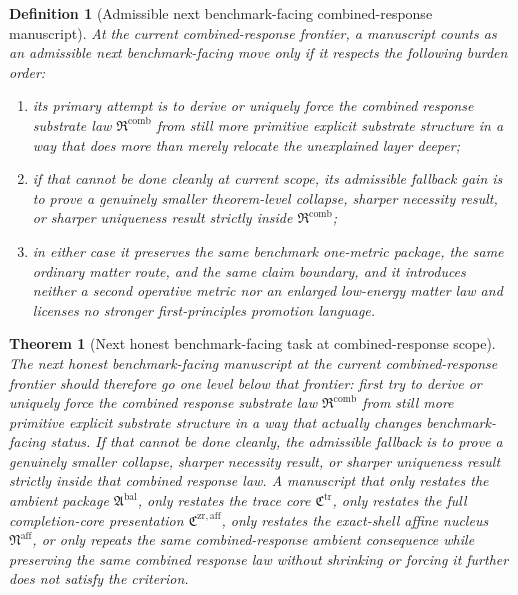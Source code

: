 \documentclass[11pt]{article}
\newcommand{\CompletionCore}{\mathfrak C^{\mathrm{zr,aff}}}
\newcommand{\TraceCore}{\mathfrak C^{\mathrm{tr}}}
\newcommand{\AffineNucleus}{\mathfrak N^{\mathrm{aff}}}
\newcommand{\AmbientPackage}{\mathfrak A^{\mathrm{bal}}}
\newcommand{\CombinedLaw}{\mathfrak R^{\mathrm{comb}}}
\newtheorem{definition}{Definition}
\newtheorem{theorem}{Theorem}
\begin{document}
\begin{definition}[Admissible next benchmark-facing combined-response manuscript]
At the current combined-response frontier, a manuscript counts as an admissible next benchmark-facing move only if it respects the following burden order:
\begin{enumerate}
    \item its primary attempt is to derive or uniquely force the combined response substrate law \(\CombinedLaw\) from still more primitive explicit substrate structure in a way that does more than merely relocate the unexplained layer deeper;
    \item if that cannot be done cleanly at current scope, its admissible fallback gain is to prove a genuinely smaller theorem-level collapse, sharper necessity result, or sharper uniqueness result strictly inside \(\CombinedLaw\);
    \item in either case it preserves the same benchmark one-metric package, the same ordinary matter route, and the same claim boundary, and it introduces neither a second operative metric nor an enlarged low-energy matter law and licenses no stronger first-principles promotion language.
\end{enumerate}
\end{definition}

\begin{theorem}[Next honest benchmark-facing task at combined-response scope]
The next honest benchmark-facing manuscript at the current combined-response frontier should therefore go one level below that frontier: first try to derive or uniquely force the combined response substrate law \(\CombinedLaw\) from still more primitive explicit substrate structure in a way that actually changes benchmark-facing status. If that cannot be done cleanly, the admissible fallback is to prove a genuinely smaller collapse, sharper necessity result, or sharper uniqueness result strictly inside that combined response law. A manuscript that only restates the ambient package \(\AmbientPackage\), only restates the trace core \(\TraceCore\), only restates the full completion-core presentation \(\CompletionCore\), only restates the exact-shell affine nucleus \(\AffineNucleus\), or only repeats the same combined-response ambient consequence while preserving the same combined response law without shrinking or forcing it further does not satisfy the criterion.
\end{theorem}
\end{document}
